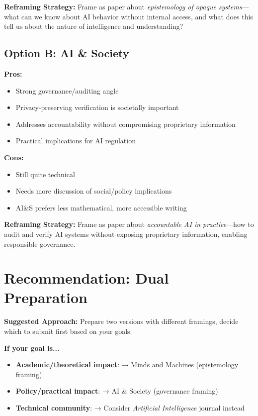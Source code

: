 \documentclass[12pt]{article}
\begin{document}
\textbf{Reframing Strategy:} Frame as paper about \textit{epistemology of opaque systems}—what can we know about AI behavior without internal access, and what does this tell us about the nature of intelligence and understanding?

\subsection{Option B: AI \& Society}

\textbf{Pros:}
\begin{itemize}[leftmargin=*]
\item Strong governance/auditing angle
\item Privacy-preserving verification is societally important
\item Addresses accountability without compromising proprietary information
\item Practical implications for AI regulation
\end{itemize}

\textbf{Cons:}
\begin{itemize}[leftmargin=*]
\item Still quite technical
\item Needs more discussion of social/policy implications
\item AI\&S prefers less mathematical, more accessible writing
\end{itemize}

\textbf{Reframing Strategy:} Frame as paper about \textit{accountable AI in practice}—how to audit and verify AI systems without exposing proprietary information, enabling responsible governance.

\section{Recommendation: Dual Preparation}

\textbf{Suggested Approach:} Prepare two versions with different framings, decide which to submit first based on your goals.

\textbf{If your goal is...}
\begin{itemize}[leftmargin=*]
\item \textbf{Academic/theoretical impact}: → Minds and Machines (epistemology framing)
\item \textbf{Policy/practical impact}: → AI \& Society (governance framing)
\item \textbf{Technical community}: → Consider \textit{Artificial Intelligence} journal instead
\end{itemize}
\end{document}
